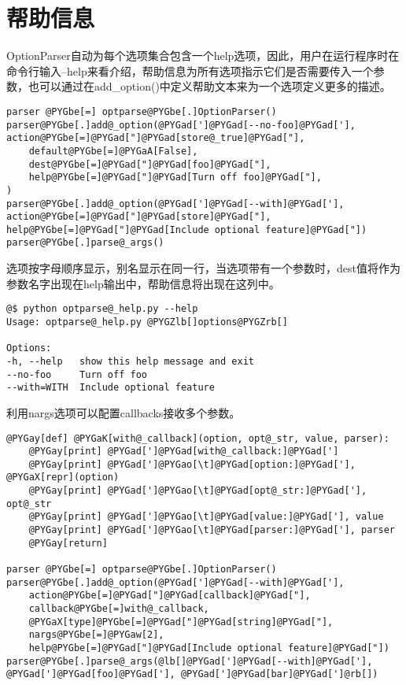 \documentclass[a4paper,10pt,english]{manual}
\begin{document}
\section{帮助信息}

OptionParser自动为每个选项集合包含一个help选项，因此，用户在运行程序时在命令行输入--help来看介绍，帮助信息为所有选项指示它们是否需要传入一个参数，也可以通过在add\_option()中定义帮助文本来为一个选项定义更多的描述。

\begin{Verbatim}[commandchars=@\[\]]
parser @PYGbe[=] optparse@PYGbe[.]OptionParser()
parser@PYGbe[.]add@_option(@PYGad[']@PYGad[--no-foo]@PYGad['], action@PYGbe[=]@PYGad["]@PYGad[store@_true]@PYGad["],
    default@PYGbe[=]@PYGaA[False],
    dest@PYGbe[=]@PYGad["]@PYGad[foo]@PYGad["],
    help@PYGbe[=]@PYGad["]@PYGad[Turn off foo]@PYGad["],
)
parser@PYGbe[.]add@_option(@PYGad[']@PYGad[--with]@PYGad['], action@PYGbe[=]@PYGad["]@PYGad[store]@PYGad["], help@PYGbe[=]@PYGad["]@PYGad[Include optional feature]@PYGad["])
parser@PYGbe[.]parse@_args()
\end{Verbatim}

选项按字母顺序显示，别名显示在同一行，当选项带有一个参数时，dest值将作为参数名字出现在help输出中，帮助信息将出现在这列中。

\begin{Verbatim}[commandchars=@\[\]]
@$ python optparse@_help.py --help
Usage: optparse@_help.py @PYGZlb[]options@PYGZrb[]

Options:
-h, --help   show this help message and exit
--no-foo     Turn off foo
--with=WITH  Include optional feature
\end{Verbatim}

利用nargs选项可以配置callbacks接收多个参数。

\begin{Verbatim}[commandchars=@\[\]]
@PYGay[def] @PYGaK[with@_callback](option, opt@_str, value, parser):
    @PYGay[print] @PYGad[']@PYGad[with@_callback:]@PYGad[']
    @PYGay[print] @PYGad[']@PYGao[\t]@PYGad[option:]@PYGad['], @PYGaX[repr](option)
    @PYGay[print] @PYGad[']@PYGao[\t]@PYGad[opt@_str:]@PYGad['], opt@_str
    @PYGay[print] @PYGad[']@PYGao[\t]@PYGad[value:]@PYGad['], value
    @PYGay[print] @PYGad[']@PYGao[\t]@PYGad[parser:]@PYGad['], parser
    @PYGay[return]

parser @PYGbe[=] optparse@PYGbe[.]OptionParser()
parser@PYGbe[.]add@_option(@PYGad[']@PYGad[--with]@PYGad['],
    action@PYGbe[=]@PYGad["]@PYGad[callback]@PYGad["],
    callback@PYGbe[=]with@_callback,
    @PYGaX[type]@PYGbe[=]@PYGad["]@PYGad[string]@PYGad["],
    nargs@PYGbe[=]@PYGaw[2],
    help@PYGbe[=]@PYGad["]@PYGad[Include optional feature]@PYGad["])
parser@PYGbe[.]parse@_args(@lb[]@PYGad[']@PYGad[--with]@PYGad['], @PYGad[']@PYGad[foo]@PYGad['], @PYGad[']@PYGad[bar]@PYGad[']@rb[])
\end{Verbatim}
\end{document}
